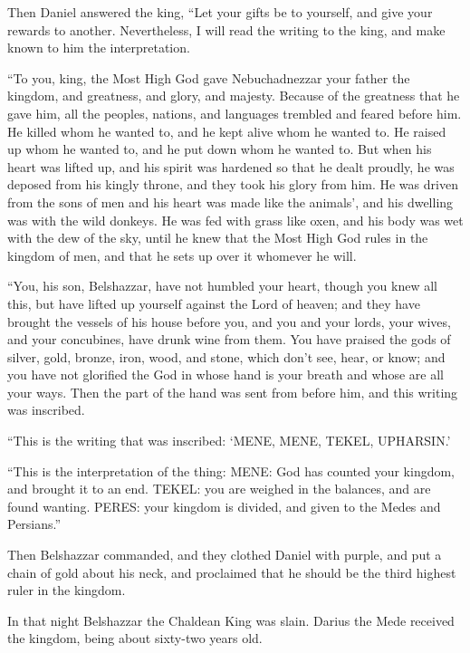  Then Daniel answered the king, ``Let your gifts be to
yourself, and give your rewards to another. Nevertheless, I will read
the writing to the king, and make known to him the interpretation.

 ``To you, king, the Most High God gave Nebuchadnezzar
your father the kingdom, and greatness, and glory, and majesty.
 Because of the greatness that he gave him, all the
peoples, nations, and languages trembled and feared before him. He
killed whom he wanted to, and he kept alive whom he wanted to. He raised
up whom he wanted to, and he put down whom he wanted to. 
But when his heart was lifted up, and his spirit was hardened so that he
dealt proudly, he was deposed from his kingly throne, and they took his
glory from him.  He was driven from the sons of men and
his heart was made like the animals', and his dwelling was with the wild
donkeys. He was fed with grass like oxen, and his body was wet with the
dew of the sky, until he knew that the Most High God rules in the
kingdom of men, and that he sets up over it whomever he will.

 ``You, his son, Belshazzar, have not humbled your heart,
though you knew all this,  but have lifted up yourself
against the Lord of heaven; and they have brought the vessels of his
house before you, and you and your lords, your wives, and your
concubines, have drunk wine from them. You have praised the gods of
silver, gold, bronze, iron, wood, and stone, which don't see, hear, or
know; and you have not glorified the God in whose hand is your breath
and whose are all your ways.  Then the part of the hand
was sent from before him, and this writing was inscribed.

 ``This is the writing that was inscribed: `MENE, MENE,
TEKEL, UPHARSIN.'

 ``This is the interpretation of the thing: MENE: God has
counted your kingdom, and brought it to an end.  TEKEL:
you are weighed in the balances, and are found wanting. 
PERES: your kingdom is divided, and given to the Medes and Persians.''

 Then Belshazzar commanded, and they clothed Daniel with
purple, and put a chain of gold about his neck, and proclaimed that he
should be the third highest ruler in the kingdom.

 In that night Belshazzar the Chaldean King was slain.
 Darius the Mede received the kingdom, being about
sixty-two years old.

